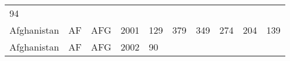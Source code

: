 \documentclass[]{article}
\begin{document}
\begin{longtable}[]{@{}llllllllll@{}}
\begin{minipage}[t]{0.09\columnwidth}
94\strut
\end{minipage}\tabularnewline
\begin{minipage}[t]{0.08\columnwidth}\raggedright\strut
Afghanistan\strut
\end{minipage} & \begin{minipage}[t]{0.04\columnwidth}\raggedright\strut
AF\strut
\end{minipage} & \begin{minipage}[t]{0.04\columnwidth}\raggedright\strut
AFG\strut
\end{minipage} & \begin{minipage}[t]{0.04\columnwidth}\raggedright\strut
2001\strut
\end{minipage} & \begin{minipage}[t]{0.08\columnwidth}\raggedright\strut
129\strut
\end{minipage} & \begin{minipage}[t]{0.09\columnwidth}\raggedright\strut
379\strut
\end{minipage} & \begin{minipage}[t]{0.09\columnwidth}\raggedright\strut
349\strut
\end{minipage} & \begin{minipage}[t]{0.09\columnwidth}\raggedright\strut
274\strut
\end{minipage} & \begin{minipage}[t]{0.09\columnwidth}\raggedright\strut
204\strut
\end{minipage} & \begin{minipage}[t]{0.09\columnwidth}\raggedright\strut
139\strut
\end{minipage}\tabularnewline
\begin{minipage}[t]{0.08\columnwidth}\raggedright\strut
Afghanistan\strut
\end{minipage} & \begin{minipage}[t]{0.04\columnwidth}\raggedright\strut
AF\strut
\end{minipage} & \begin{minipage}[t]{0.04\columnwidth}\raggedright\strut
AFG\strut
\end{minipage} & \begin{minipage}[t]{0.04\columnwidth}\raggedright\strut
2002\strut
\end{minipage} & \begin{minipage}[t]{0.08\columnwidth}\raggedright\strut
90\strut
\end{minipage} & \begin{minipage}[t]{0.09\columnwidth}\raggedright\strut

\end{minipage}
\end{longtable}
\end{document}
